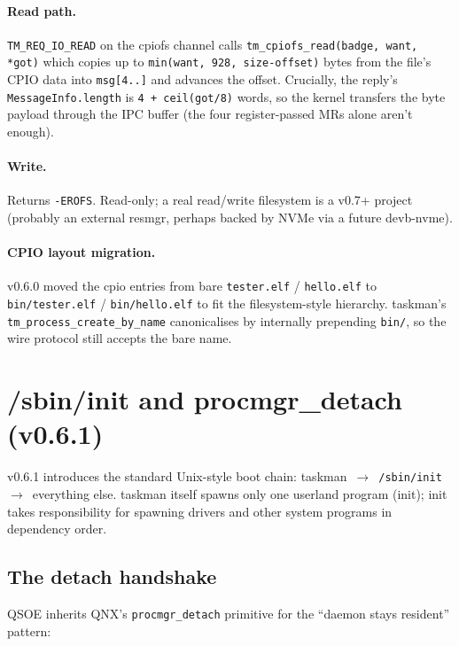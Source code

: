 \paragraph{Read path.}  \texttt{TM\_REQ\_IO\_READ} on the cpiofs
channel calls \texttt{tm\_cpiofs\_read(badge, want, *got)} which
copies up to \texttt{min(want, 928, size-offset)} bytes from
the file's CPIO data into \texttt{msg[4..]} and advances the
offset.  Crucially, the reply's \texttt{MessageInfo.length} is
\texttt{4 + ceil(got/8)} words, so the kernel transfers the
byte payload through the IPC buffer (the four register-passed
MRs alone aren't enough).

\paragraph{Write.}  Returns \texttt{-EROFS}.  Read-only; a real
read/write filesystem is a v0.7+ project (probably an external
resmgr, perhaps backed by NVMe via a future devb-nvme).

\paragraph{CPIO layout migration.}  v0.6.0 moved the cpio entries
from bare \texttt{tester.elf} / \texttt{hello.elf} to
\texttt{bin/tester.elf} / \texttt{bin/hello.elf} to fit the
filesystem-style hierarchy.  taskman's \texttt{tm\_process\_create\_by\_name}
canonicalises by internally prepending \texttt{bin/}, so the wire
protocol still accepts the bare name.

\section{/sbin/init and procmgr\_detach (v0.6.1)}

v0.6.1 introduces the standard Unix-style boot chain:
taskman~$\to$~\texttt{/sbin/init}~$\to$~everything else.  taskman
itself spawns only one userland program (init); init takes
responsibility for spawning drivers and other system programs in
dependency order.

\subsection{The detach handshake}

QSOE inherits QNX's \texttt{procmgr\_detach} primitive for the
``daemon stays resident'' pattern:


